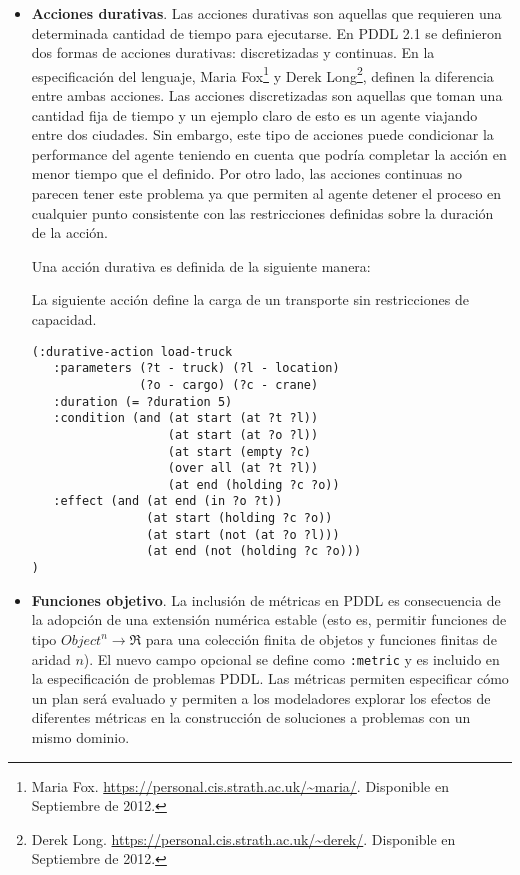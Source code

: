 	\begin{itemize}

	\item {\bf Acciones durativas}. Las acciones durativas son aquellas
	que requieren una determinada cantidad de tiempo para ejecutarse. En
	PDDL 2.1 se definieron dos formas de acciones durativas: discretizadas
	y continuas. En la especificaci\'on del lenguaje, Maria 
	Fox\footnote{Maria
          Fox. \url{https://personal.cis.strath.ac.uk/~maria/}. Disponible
        en Septiembre de 2012.} y Derek 
	Long\footnote{Derek
          Long. \url{https://personal.cis.strath.ac.uk/~derek/}. Disponible
        en Septiembre de 2012.},
	definen la diferencia entre ambas acciones. 
	Las acciones discretizadas son aquellas que toman
	una cantidad fija de tiempo y un ejemplo claro de esto es un agente
	viajando entre dos ciudades. 
	Sin embargo, este tipo de acciones puede condicionar la performance del 
	agente teniendo en cuenta que podr\'ia completar
	la acci\'on en menor tiempo que el definido. Por otro lado, las acciones
	continuas no parecen tener este problema ya que permiten al agente detener
	el proceso en cualquier punto consistente con las restricciones definidas
	sobre la duraci\'on de la acci\'on.
	
	Una acci\'on durativa es definida de la siguiente manera:
	
	\begin{ejemplo}
	
	La siguiente acci\'on define la carga de un transporte sin
	restricciones de capacidad.
	
	\begin{verbatim}
(:durative-action load-truck
   :parameters (?t - truck) (?l - location)
               (?o - cargo) (?c - crane)
   :duration (= ?duration 5)
   :condition (and (at start (at ?t ?l))
                   (at start (at ?o ?l))
                   (at start (empty ?c)
                   (over all (at ?t ?l))
                   (at end (holding ?c ?o))
   :effect (and (at end (in ?o ?t))
                (at start (holding ?c ?o))
                (at start (not (at ?o ?l)))
                (at end (not (holding ?c ?o)))
)
	\end{verbatim}
	\end{ejemplo}

	\item {\bf Funciones objetivo}. La inclusi\'on de m\'etricas en PDDL
	es consecuencia de la adopci\'on de una extensi\'on num\'erica estable
	(esto es, permitir funciones de tipo $Object^{n} \longrightarrow \Re$
	para una colecci\'on finita de objetos y funciones finitas de aridad $n$).
	El nuevo campo opcional se define como \texttt{:metric} y es incluido
	en la especificaci\'on de problemas PDDL. Las m\'etricas permiten especificar
	c\'omo un plan ser\'a evaluado y permiten a los modeladores explorar los efectos
	de diferentes m\'etricas en la construcci\'on de soluciones a problemas con un
	mismo dominio. 


\end{itemize}
